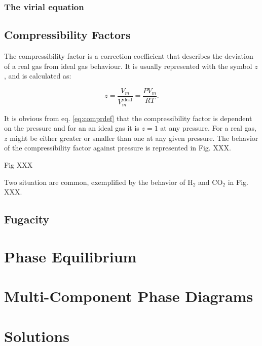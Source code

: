 \documentclass[
]{book}
\theoremstyle{definition}
\theoremstyle{definition}
\theoremstyle{definition}
\theoremstyle{remark}
\begin{document}
\hypertarget{the-virial-equation}{%
\subsection{The virial equation}\label{the-virial-equation}}

\hypertarget{compressibility-factors}{%
\section{Compressibility Factors}\label{compressibility-factors}}

The compressibility factor is a correction coefficient that describes the deviation of a real gas from ideal gas behaviour. It is usually represented with the symbol \(z\), and is calculated as:

\begin{equation}
z=\frac{V_m}{V_m^{\text{ideal}}} = \frac{P V_m}{RT}.
\label{eq:comprdef}
\end{equation}

It is obvious from eq. \eqref{eq:comprdef} that the compressibility factor is dependent on the pressure and for an an ideal gas it is \(z=1\) at any pressure. For a real gas, \(z\) might be either greater or smaller than one at any given pressure. The behavior of the compressibility factor against pressure is represented in Fig. XXX.

Fig XXX

Two situation are common, exemplified by the behavior of \(\mathrm{H}_2\) and \(\mathrm{CO}_2\) in Fig. XXX.

\hypertarget{fugacity}{%
\section{Fugacity}\label{fugacity}}

\hypertarget{PhaseEquilibrium}{%
\chapter{Phase Equilibrium}\label{PhaseEquilibrium}}

\hypertarget{MCPhaseDiagrams}{%
\chapter{Multi-Component Phase Diagrams}\label{MCPhaseDiagrams}}

\hypertarget{Solutions}{%
\chapter{Solutions}\label{Solutions}}
\end{document}
